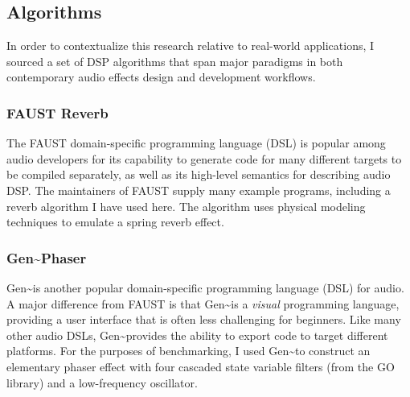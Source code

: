 \documentclass[a4paper]{article}
\begin{document}

\subsection{ Algorithms }

In order to contextualize this research relative to real-world applications, I sourced a set of DSP algorithms that span major paradigms in both contemporary audio effects design and development workflows.


\subsubsection{ FAUST Reverb}

The FAUST domain-specific programming language (DSL) is popular among audio developers for its capability to generate code for many different targets to be compiled separately, as well as its high-level semantics for describing audio DSP. The maintainers of FAUST supply many example programs, including a reverb algorithm I have used here. The algorithm uses physical modeling techniques to emulate a spring reverb effect. 


\subsubsection{ Gen\textasciitilde \space Phaser }

Gen\textasciitilde \space is another popular domain-specific programming language (DSL) for audio. A major difference from FAUST is that Gen\textasciitilde \space is a \textit{visual} programming language, providing a user interface that is often less challenging for beginners. Like many other audio DSLs, Gen\textasciitilde \space provides the ability to export code to target different platforms. For the purposes of benchmarking, I used Gen\textasciitilde \space to construct an elementary phaser effect with four cascaded state variable filters (from the GO library\cite{BD0831917X}) and a low-frequency oscillator. 
\end{document}

